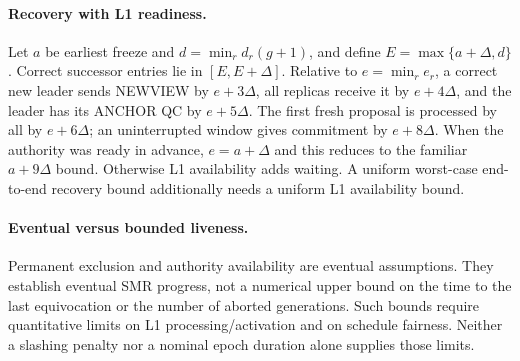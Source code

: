 \documentclass[11pt,a4paper]{article}
\begin{document}
\paragraph{Recovery with L1 readiness.}
Let $a$ be earliest freeze and $d=\min_r d_r(g+1)$, and define
$E=\max\{a+\Delta,d\}$. Correct successor entries lie in $[E,E+\Delta]$.
Relative to $e=\min_r e_r$, a correct new leader sends NEWVIEW by
$e+3\Delta$, all replicas receive it by $e+4\Delta$, and the leader
has its ANCHOR QC by $e+5\Delta$. The first fresh proposal is processed
by all by $e+6\Delta$; an uninterrupted window gives commitment by
$e+8\Delta$. When the authority was ready in advance, $e=a+\Delta$
and this reduces to the familiar $a+9\Delta$ bound. Otherwise L1
availability adds waiting. A uniform worst-case end-to-end recovery
bound additionally needs a uniform L1 availability bound.

\paragraph{Eventual versus bounded liveness.}
Permanent exclusion and authority availability are eventual assumptions.
They establish eventual SMR progress, not a numerical upper bound on the
time to the last equivocation or the number of aborted generations.
Such bounds require quantitative limits on L1 processing/activation and
on schedule fairness. Neither a slashing penalty nor a nominal epoch
duration alone supplies those limits.
\end{document}
